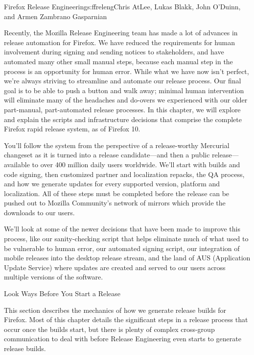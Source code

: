 \begin{aosachapter}{Firefox Release Engineering}{s:ffreleng}{Chris AtLee, Lukas Blakk, John O'Duinn, and Armen Zambrano Gasparnian}

Recently, the Mozilla Release Engineering team has made a lot of advances
in release automation for Firefox. We have
reduced the requirements for human involvement during signing and sending
notices to stakeholders, and have automated
many other small manual steps, because each manual step in the process is an
opportunity for human error. While what we have now isn't perfect,
we're always striving to streamline and automate our release
process. Our final goal is to be able to push a button and walk away;
minimal human intervention will eliminate many of the
headaches and do-overs we experienced with our older part-manual,
part-automated release processes. In this chapter, we will explore and
explain the scripts and infrastructure decisions that comprise
the complete Firefox rapid release system, as of Firefox 10.

You'll follow the system from the perspective of a release-worthy
Mercurial changeset as it is turned into a release candidate---and
then a public release---available to over 400 million daily users
worldwide.  We'll start with builds and code signing, then customized
partner and localization repacks, the QA process, and how we generate
updates for every supported version, platform and localization. All of
these steps must be completed before the release can be pushed out to
Mozilla Community's network of mirrors which provide the downloads to
our users.

We'll look at some of the newer decisions that have been made to
improve this process, like our sanity-checking script that helps
eliminate much of what used to be vulnerable to human error, our
automated signing script, our integration of mobile releases into the
desktop release stream, and the land of AUS (Application Update Service) where updates are
created and served to our users across multiple versions of the
software.

\begin{aosasect1}{Look  Ways Before You Start a Release}

This section describes the mechanics of how we generate release builds
for Firefox. Most of this chapter details the significant
steps in a release process that occur once the builds start, but
there is plenty of complex cross-group communication to deal
with before Release Engineering even starts to generate release
builds.


\end{aosasect1}
\end{aosachapter}
